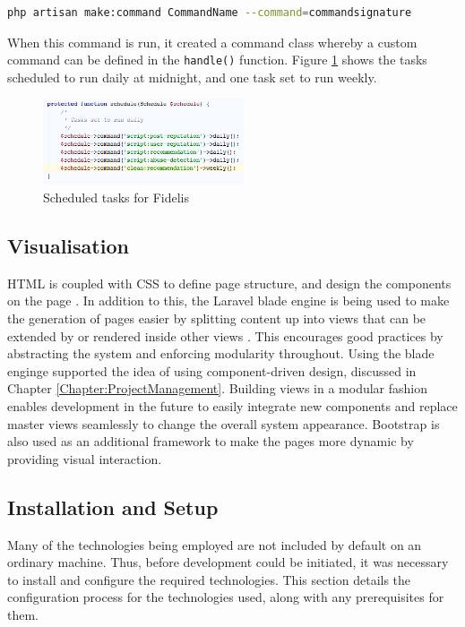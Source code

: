 \begin{lstlisting}[language=bash]
php artisan make:command CommandName --command=commandsignature
\end{lstlisting}

When this command is run, it created a command class whereby a custom command can be defined in the \texttt{handle()} function. Figure \ref{fig:FidelisSchedule} shows the tasks scheduled to run daily at midnight, and one task set to run weekly.

\begin{figure}[H]
\centering
\includegraphics[height=1in]{Images/Implementation/FidelisSchedule}
\caption{Scheduled tasks for Fidelis}
\label{fig:FidelisSchedule}
\end{figure}

\subsection{Visualisation}
HTML is coupled with CSS to define page structure, and design the components on the page \cite{W3:HTML5, W3:CSS}. In addition to this, the Laravel blade engine is being used to make the generation of pages easier by splitting content up into views that can be extended by or rendered inside other views \cite{Laravel:Blade}. This encourages good practices by abstracting the system and enforcing modularity throughout. Using the blade enginge supported the idea of using component-driven design, discussed in Chapter \ref{Chapter:ProjectManagement}. Building views in a modular fashion enables development in the future to easily integrate new components and replace master views seamlessly to change the overall system appearance. Bootstrap is also used as an additional framework to make the pages more dynamic by providing visual interaction.

\subsection{Installation and Setup}
Many of the technologies being employed are not included by default on an ordinary machine. Thus, before development could be initiated, it was necessary to install and configure the required technologies. This section details the configuration process for the technologies used, along with any prerequisites for them.

